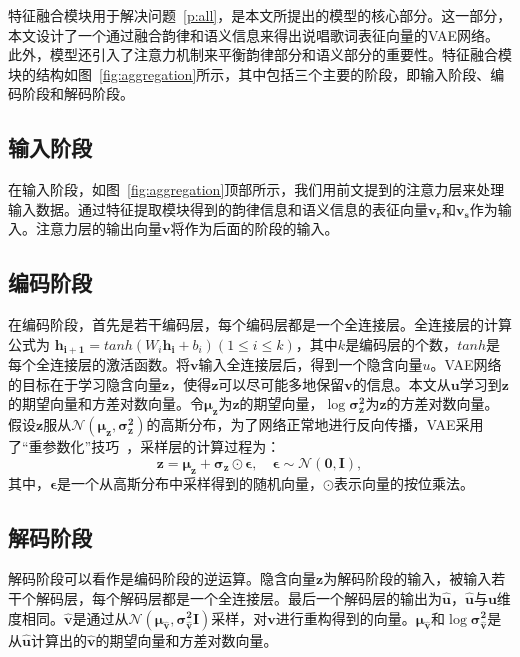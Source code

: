 特征融合模块用于解决问题~\ref{p:all}，是本文所提出的模型的核心部分。这一部分，本文设计了一个通过融合韵律和语义信息来得出说唱歌词表征向量的VAE网络。此外，模型还引入了注意力机制来平衡韵律部分和语义部分的重要性。特征融合模块的结构如图~\ref{fig:aggregation}所示，其中包括三个主要的阶段，即输入阶段、编码阶段和解码阶段。\par

\subsection{输入阶段}
在输入阶段，如图~\ref{fig:aggregation}顶部所示，我们用前文提到的注意力层来处理输入数据。通过特征提取模块得到的韵律信息和语义信息的表征向量$\bm{v_r}$和$\bm{v_s}$作为输入。注意力层的输出向量$\bm v$将作为后面的阶段的输入。\par

\subsection{编码阶段}
在编码阶段，首先是若干编码层，每个编码层都是一个全连接层。全连接层的计算公式为 $\bm{h_{i+1}}=tanh(W_i \bm{h_i}+b_i)(1 \leq i \leq k)$，其中$k$是编码层的个数，$tanh$是每个全连接层的激活函数。将$\bm v$输入全连接层后，得到一个隐含向量$u$。VAE网络的目标在于学习隐含向量$\bm z$，使得$\bm z$可以尽可能多地保留$\bm v$的信息。本文从$\bm u$学习到$\bm z$的期望向量和方差对数向量。令$\bm{\mu_z}$为$\bm z$的期望向量，$\log\bm{\sigma_z^2}$为$\bm z$的方差对数向量。假设$\bm z$服从${\mathcal{N}(\bm {\mu_z},\bm{\sigma_z^2})}$的高斯分布，为了网络正常地进行反向传播，VAE采用了“重参数化”技巧~\cite{kingma2014auto}，采样层的计算过程为：
\begin{equation}
  \bm{z}=\bm{\mu_z}+\bm{\sigma_z}\odot \bm{\epsilon},\quad \bm \epsilon \sim \bm{\mathcal{N}(0, \bm I)},
\end{equation}
其中，$\bm \epsilon$是一个从高斯分布中采样得到的随机向量，$\odot$表示向量的按位乘法。\par

\subsection{解码阶段}
解码阶段可以看作是编码阶段的逆运算。隐含向量$\bm z$为解码阶段的输入，被输入若干个解码层，每个解码层都是一个全连接层。最后一个解码层的输出为$\bm{\hat u}$，$\bm{\hat u}$与$\bm u$维度相同。$\bm{\hat v}$是通过从${\mathcal{N}(\bm {\mu_{\hat v}},\bm{\sigma_{\hat v}^2I})}$采样，对$\bm v$进行重构得到的向量。$\bm {\mu_{\hat v}}$和$\log\bm{\sigma_{\hat v}^2}$是从$\bm{\hat u}$计算出的$\bm{\hat v}$的期望向量和方差对数向量。\par


